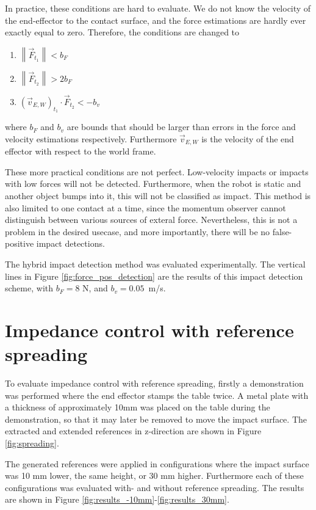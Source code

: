 \documentclass[11pt]{report}
\numberwithin{equation}{section}        %
\numberwithin{figure}{section}          %
\numberwithin{table}{section}           %
\begin{document}
  In practice, these conditions are hard to evaluate. We do not know the velocity of the end-effector to the contact surface, and the force estimations are hardly ever exactly equal to zero. Therefore, the conditions are changed to

  \begin{enumerate}
  \item $\left \| \vec{F}_{t_1} \right \|< b_F$
  \item $\left \| \vec{F}_{t_2} \right \|> 2b_F$
  \item $(\vec{v}_{E,W})_{t_1} \cdot \vec{F}_{t_2} < -b_v$  
\end{enumerate}
  where $b_F$ and $b_v$ are bounds that should be larger than errors in the force and velocity estimations respectively. Furthermore $\vec{v}_{E,W}$ is the velocity of the end effector with respect to the world frame.

  These more practical conditions are not perfect. Low-velocity impacts or impacts with low forces will not be detected. Furthermore, when the robot is static and another object bumps into it, this will not be classified as impact. This method is also limited to one contact at a time, since the momentum observer cannot distinguish between various sources of exteral force. Nevertheless, this is not a problem in the desired usecase, and more importantly, there will be no false-positive impact detections. 

  The hybrid impact detection method was evaluated experimentally. The vertical lines in Figure \ref{fig:force_pos_detection} are the results of this impact detection scheme, with $b_F = 8$ N, and $b_v = 0.05$~m/s. 

  \section{Impedance control with reference spreading}\label{sec:RS}
  To evaluate impedance control with reference spreading, firstly a demonstration was performed where the end effector stamps the table twice. A metal plate with a thickness of approximately 10mm was placed on the table during the demonstration, so that it may later be removed to move the impact surface. The extracted and extended references in z-direction are shown in Figure \ref{fig:spreading}.

  The generated references were applied in configurations where the impact surface was 10 mm lower, the same height, or 30 mm higher. Furthermore each of these configurations was evaluated with- and without reference spreading. The results are shown in Figure \ref{fig:results_-10mm}-\ref{fig:results_30mm}. 
\end{document}
